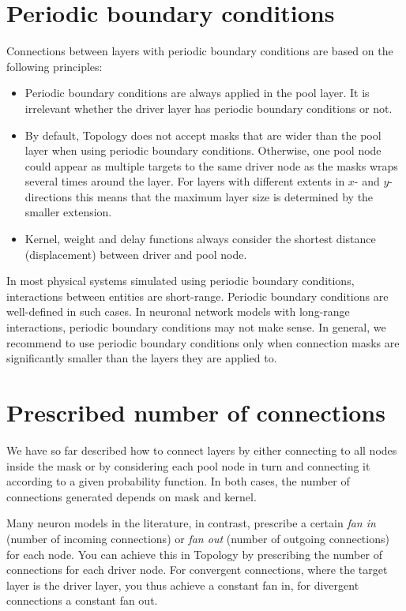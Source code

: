 \documentclass[a4paper,12pt]{report}
\begin{document}
\section{Periodic boundary conditions}\label{sec:conn_pbc}

Connections between layers with periodic boundary
conditions are based
on the following principles:
\begin{itemize}
\item Periodic boundary conditions are always applied in the pool
  layer. It is irrelevant whether the driver layer has periodic
  boundary conditions or not.
\item By default, Topology does not accept masks that are wider than
  the pool layer when using periodic boundary conditions. Otherwise,
  one pool node could appear as multiple targets to the same driver
  node as the masks wraps several times around the layer. For layers
  with different extents in $x$- and $y$-directions this means that
  the maximum layer size is determined by the smaller extension.
\item Kernel, weight and delay functions always consider the shortest
  distance (displacement) between driver and pool node.
\end{itemize}
In most physical systems simulated using periodic boundary conditions,
interactions between entities are short-range. Periodic boundary
conditions are well-defined in such cases. In neuronal network models
with long-range interactions, periodic boundary conditions may not
make sense. In general, we recommend to use periodic boundary
conditions only when connection masks are significantly smaller than
the layers they are applied to.


\section{Prescribed number of connections}\label{sec:prescribed_numbers}

We have so far described how to connect layers by either connecting to
all nodes inside the mask or by considering each pool node in turn and
connecting it according to a given probability function. In both
cases, the number of connections generated depends on mask and kernel.

Many neuron models in the literature, in contrast, prescribe a certain
\emph{fan in} (number of incoming connections) or
\emph{fan out} (number of outgoing connections) for
each node. You can achieve this in Topology by prescribing the number
of connections for each driver
node. For convergent connections, where the target layer is the driver
layer, you thus achieve a constant fan in, for divergent connections a
constant fan out.
\end{document}
